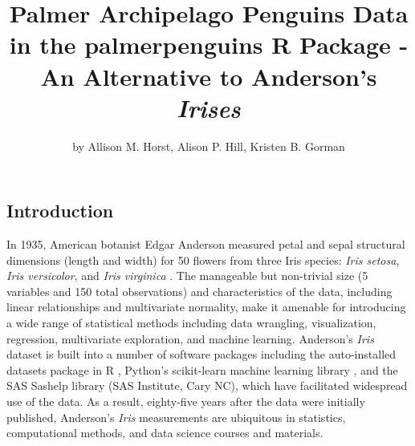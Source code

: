 \title{Palmer Archipelago Penguins Data in the palmerpenguins R Package
- An Alternative to Anderson's \emph{Irises}}
\author{by Allison M. Horst, Alison P. Hill, Kristen B. Gorman}

\maketitle


\hypertarget{introduction}{%
\subsection{Introduction}\label{introduction}}

In 1935, American botanist Edgar Anderson measured petal and sepal
structural dimensions (length and width) for 50 flowers from three Iris
species: \emph{Iris setosa}, \emph{Iris versicolor}, and \emph{Iris
virginica} \citep{anderson_irises_1935}. The manageable but non-trivial
size (5 variables and 150 total observations) and characteristics of the
data, including linear relationships and multivariate normality, make it
amenable for introducing a wide range of statistical methods including
data wrangling, visualization, regression, multivariate exploration, and
machine learning. Anderson's \emph{Iris} dataset is built into a number
of software packages including the auto-installed datasets package in R
\citep{r_core_team_r_2019}, Python's scikit-learn machine learning
library \citep{pedregosa_scikit-learn_2011}, and the SAS Sashelp library
(SAS Institute, Cary NC), which have facilitated widespread use of the
data. As a result, eighty-five years after the data were initially
published, Anderson's \emph{Iris} measurements are ubiquitous in
statistics, computational methods, and data science courses and
materials.

